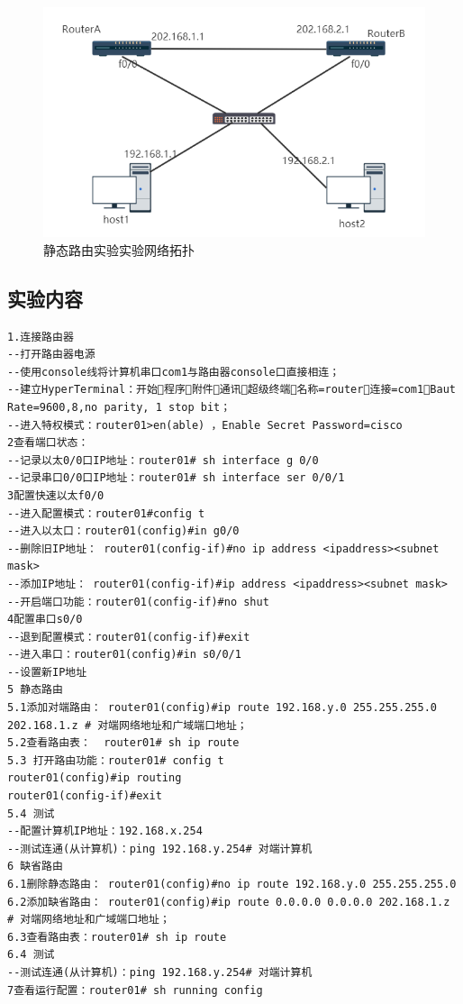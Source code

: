 \documentclass[lang=cn,11pt,a4paper,cite=authoryear]{elegantpaper}
\begin{document}
\begin{figure}[htbp]
	\centering
	\includegraphics[width=0.7\linewidth]{image/screenshot024}
	\caption{静态路由实验实验网络拓扑}
	\label{fig:screenshot024}
\end{figure}


\subsection{实验内容}

\begin{lstlisting}
1.连接路由器
--打开路由器电源
--使用console线将计算机串口com1与路由器console口直接相连；
--建立HyperTerminal：开始程序附件通讯超级终端名称=router连接=com1Baut Rate=9600,8,no parity, 1 stop bit；
--进入特权模式：router01>en(able) ，Enable Secret Password=cisco
2查看端口状态：
--记录以太0/0口IP地址：router01# sh interface g 0/0
--记录串口0/0口IP地址：router01# sh interface ser 0/0/1
3配置快速以太f0/0
--进入配置模式：router01#config t
--进入以太口：router01(config)#in g0/0
--删除旧IP地址： router01(config-if)#no ip address <ipaddress><subnet mask>
--添加IP地址： router01(config-if)#ip address <ipaddress><subnet mask>
--开启端口功能：router01(config-if)#no shut
4配置串口s0/0
--退到配置模式：router01(config-if)#exit
--进入串口：router01(config)#in s0/0/1
--设置新IP地址
5 静态路由
5.1添加对端路由： router01(config)#ip route 192.168.y.0 255.255.255.0 202.168.1.z # 对端网络地址和广域端口地址；
5.2查看路由表：  router01# sh ip route
5.3 打开路由功能：router01# config t
router01(config)#ip routing
router01(config-if)#exit
5.4 测试
--配置计算机IP地址：192.168.x.254
--测试连通(从计算机)：ping 192.168.y.254# 对端计算机
6 缺省路由
6.1删除静态路由： router01(config)#no ip route 192.168.y.0 255.255.255.0 
6.2添加缺省路由： router01(config)#ip route 0.0.0.0 0.0.0.0 202.168.1.z # 对端网络地址和广域端口地址；
6.3查看路由表：router01# sh ip route
6.4 测试
--测试连通(从计算机)：ping 192.168.y.254# 对端计算机
7查看运行配置：router01# sh running config

\end{lstlisting}
\end{document}
